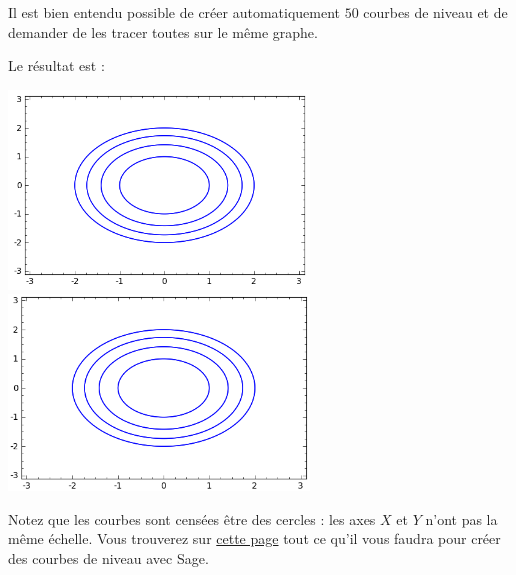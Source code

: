 Il est bien entendu possible de créer automatiquement $50$ courbes de niveau et de demander de les tracer toutes sur le même graphe.

Le résultat est :

\begin{center}
    \ifpdf
        \includegraphics[width=8cm]{niveauCercles.png}
    \else
        \includegraphics[width=8cm]{niveauCercles.eps}
    \fi
\end{center}
Notez que les courbes sont censées être des cercles : les axes $X$ et $Y$ n'ont pas la même échelle. Vous trouverez sur \href{http://uw.sagenb.org/home/pub/23/}{cette page} tout ce qu'il vous faudra pour créer des courbes de niveau avec Sage.


